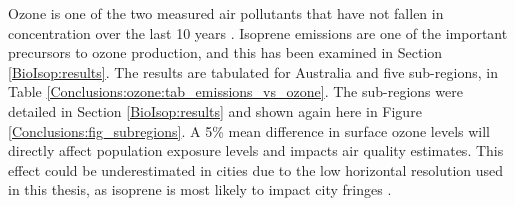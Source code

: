   Ozone is one of the two measured air pollutants that have not fallen in concentration over the last 10 years \parencite{SOE2016}.
  Isoprene emissions are one of the important precursors to ozone production, and this has been examined in Section \ref{BioIsop:results}.
  The results are tabulated for Australia and five sub-regions, in Table \ref{Conclusions:ozone:tab_emissions_vs_ozone}.
  The sub-regions were detailed in Section \ref{BioIsop:results} and shown again here in Figure \ref{Conclusions:fig_subregions}. 
  A 5\% mean difference in surface ozone levels will directly affect population exposure levels and impacts air quality estimates. 
  This effect could be underestimated in cities due to the low horizontal resolution used in this thesis, as isoprene is most likely to impact city fringes \parencite{Millet2016}.
